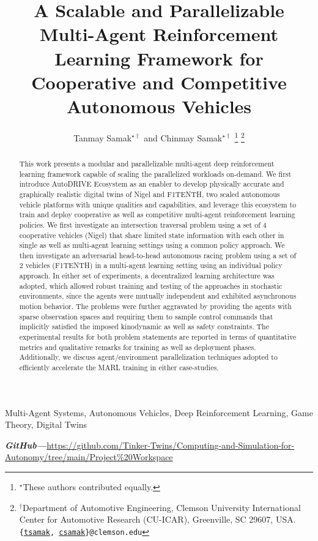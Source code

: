\documentclass[letterpaper, 10 pt, conference]{ieeeconf}  %
\title{\LARGE \bf
	A Scalable and Parallelizable Multi-Agent Reinforcement Learning Framework for Cooperative and Competitive Autonomous Vehicles
}
\author{Tanmay Samak$^{\star \dagger}$ and Chinmay Samak$^{\star \dagger}$%
	\thanks{$^{\star}$These authors contributed equally.}%
	\thanks{$^{\dagger}$Department of Automotive Engineering, Clemson University International Center for Automotive Research (CU-ICAR), Greenville, SC 29607, USA.
		{\tt\small {\{\href{mailto:tsamak@clemson.edu}{tsamak}, \href{mailto:csamak@clemson.edu}{csamak}\}@clemson.edu}}}%
}
\begin{document}
	
	\maketitle
	\thispagestyle{empty}
	\pagestyle{empty}
	
	
	\begin{abstract}
		This work presents a modular and parallelizable multi-agent deep reinforcement learning framework capable of scaling the parallelized workloads on-demand. We first introduce AutoDRIVE Ecosystem as an enabler to develop physically accurate and graphically realistic digital twins of Nigel and F1TENTH, two scaled autonomous vehicle platforms with unique qualities and capabilities, and leverage this ecosystem to train and deploy cooperative as well as competitive multi-agent reinforcement learning policies. We first investigate an intersection traversal problem using a set of 4 cooperative vehicles (Nigel) that share limited state information with each other in single as well as multi-agent learning settings using a common policy approach. We then investigate an adversarial head-to-head autonomous racing problem using a set of 2 vehicles (F1TENTH) in a multi-agent learning setting using an individual policy approach. In either set of experiments, a decentralized learning architecture was adopted, which allowed robust training and testing of the approaches in stochastic environments, since the agents were mutually independent and exhibited asynchronous motion behavior. The problems were further aggravated by providing the agents with sparse observation spaces and requiring them to sample control commands that implicitly satisfied the imposed kinodynamic as well as safety constraints. The experimental results for both problem statements are reported in terms of quantitative metrics and qualitative remarks for training as well as deployment phases. Additionally, we discuss agent/environment parallelization techniques adopted to efficiently accelerate the MARL training in either case-studies.\\%
	\end{abstract}
	
	\begin{keywords}
		Multi-Agent Systems, Autonomous Vehicles, Deep Reinforcement Learning, Game Theory, Digital Twins\\%
	\end{keywords}
	
	\textbf{\textit{\small GitHub---}}{\small \url{https://github.com/Tinker-Twins/Computing-and-Simulation-for-Autonomy/tree/main/Project\%20Workspace}}\\%
	
\end{document}
